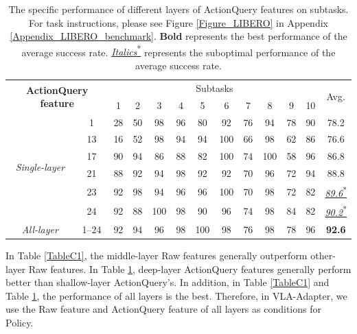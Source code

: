 \begin{table}[!htbp]
	\centering
    \small
	\caption{The specific performance of different layers of ActionQuery features on subtasks. For task instructions, please see Figure \ref{Figure_LIBERO} in Appendix \ref{Appendix_LIBERO_benchmark}. \textbf{Bold} represents the best performance of the average success rate. \underline{\textit{Italics}\textsuperscript{*}} represents the suboptimal performance of the average success rate.}\label{TableC2}%
	\begin{tabular}{cc|cccccccccc|c}
		\toprule[1pt]
		\multicolumn{2}{c|}{\multirow{2}{*}{\textbf{ActionQuery feature}}}&\multicolumn{10}{c|}{Subtasks}&\multirow{2}{*}{Avg.}\\
		&&1     & 2     & 3     & 4     & 5     & 6     & 7     & 8     & 9     & 10&\\
		\midrule[0.5pt]
		\multirow{6}{*}{\textit{Single-layer}}&1&    28    & 50    & 98    & 96    & 80    & 92    & 76    & 94    & 78    & 90    & 78.2 \\
		&13&    16    & 52    & 98    & 94    & 94    & 100   & 66    & 98    & 62    & 86    & 76.6 \\
		&17&    90    & 94    & 86    & 88    & 82    & 100   & 74    & 100   & 58    & 96    & 86.8 \\
		&21&    88    & 92    & 94    & 98    & 92    & 92    & 70    & 96    & 72    & 94    & 88.8 \\
		&23&    92    & 98    & 94    & 96    & 96    & 100   & 70    & 98    & 72    & 82    & \underline{\textit{89.6}\textsuperscript{*}} \\
		&24&    92    & 88    & 100   & 98    & 90    & 96    & 74    & 98    & 84    & 82    & \underline{\textit{90.2}\textsuperscript{*}} \\
		\midrule[0.5pt]
		\textit{All-layer} &1--24&    92    & 94    & 96    & 98    & 100   & 98    & 76    & 98    & 78    & 96    & \textbf{92.6} \\
		\bottomrule[1pt]
	\end{tabular}%
\end{table}%

In Table \ref{TableC1}, the middle-layer Raw features generally outperform other-layer Raw features. In Table \ref{TableC2}, deep-layer ActionQuery features generally perform better than shallow-layer ActionQuery's. In addition, in Table \ref{TableC1} and Table \ref{TableC2}, the performance of all layers is the best. Therefore, in VLA-Adapter, we use the Raw feature and ActionQuery feature of all layers as conditions for Policy.

